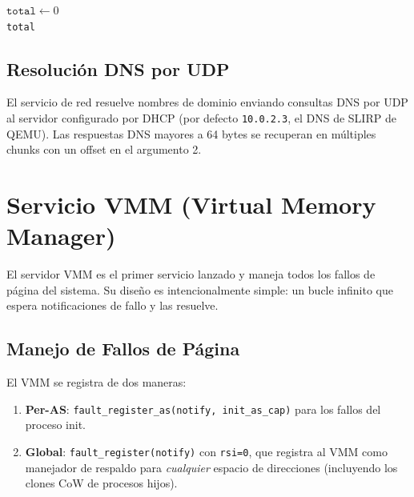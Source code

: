 \documentclass[11pt,twoside,openright]{book}
\theoremstyle{definition}
\theoremstyle{plain}
\theoremstyle{remark}
\begin{document}
\begin{algorithm}[H]
\caption{\textsc{TCP-Recv-Multi}: Recepción TCP multi-chunk}
\label{alg:tcp-recv}
$\texttt{total} \leftarrow 0$ \\
\Return \texttt{total}
\end{algorithm}

\subsection{Resolución DNS por UDP}

El servicio de red resuelve nombres de dominio enviando consultas DNS por UDP
al servidor configurado por DHCP (por defecto \texttt{10.0.2.3}, el DNS de SLIRP
de QEMU). Las respuestas DNS mayores a 64 bytes se recuperan en múltiples chunks
con un offset en el argumento 2.

\section{Servicio VMM (Virtual Memory Manager)}
\label{sec:vmm-service}

El servidor VMM es el primer servicio lanzado y maneja todos los fallos de
página del sistema. Su diseño es intencionalmente simple: un bucle infinito
que espera notificaciones de fallo y las resuelve.

\subsection{Manejo de Fallos de Página}

El VMM se registra de dos maneras:
\begin{enumerate}
    \item \textbf{Per-AS}: \texttt{fault\_register\_as(notify, init\_as\_cap)} para
          los fallos del proceso init.
    \item \textbf{Global}: \texttt{fault\_register(notify)} con \texttt{rsi=0},
          que registra al VMM como manejador de respaldo para \emph{cualquier}
          espacio de direcciones (incluyendo los clones CoW de procesos hijos).
\end{enumerate}
\end{document}
